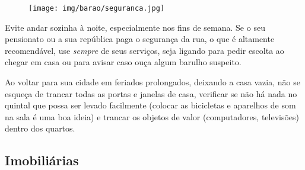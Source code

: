 \begin{figure}[h!]
    \centering
    \texttt{[image: img/barao/seguranca.jpg]}
\end{figure}

Evite andar sozinha à noite, especialmente nos fins de semana. Se o seu
pensionato ou a sua república paga o segurança da rua, o que é altamente
recomendável, use \emph{sempre} de seus serviços, seja ligando para pedir
escolta ao chegar em casa ou para avisar caso ouça algum barulho suspeito.

Ao voltar para sua cidade em feriados prolongados, deixando a casa vazia, não
se esqueça de trancar todas as portas e janelas de casa, verificar se não há
nada no quintal que possa ser levado facilmente (colocar as bicicletas e
aparelhos de som na sala é uma boa ideia) e trancar os objetos de valor
(computadores, televisões) dentro dos quartos.

\subsection{Imobiliárias}

